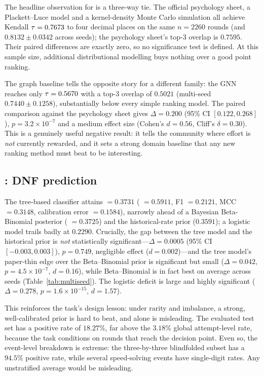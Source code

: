 The headline observation for  is a three-way tie. The official \wca{}
psychology sheet, a Plackett--Luce model and a kernel-density Monte Carlo
simulation all achieve Kendall $\tau=0.7673$ to four decimal places on the
same $n=2260$ rounds (and $0.8132\pm0.0342$ across seeds); the psychology
sheet's top-3 overlap is $0.7595$. Their paired differences are exactly zero,
so no significance test is defined. At this sample size, additional
distributional modelling buys nothing over a good point ranking.

The graph baseline tells the opposite story for a different family: the GNN
reaches only $\tau=0.5670$ with a top-3 overlap of $0.5021$ (multi-seed
$0.7440\pm0.1258$), substantially below every simple ranking model. The paired
comparison against the psychology sheet gives $\Delta=0.200$
(95\% CI $[0.122,0.268]$), $p=3.2\times10^{-7}$ and a medium effect size
(Cohen's $d=0.56$, Cliff's $\delta=0.30$). This is a genuinely useful negative
result: it tells the community where effort is \emph{not} currently rewarded,
and it sets a strong domain baseline that any new ranking method must beat to
be interesting.

\subsection{: DNF prediction}
\label{sec:results-t3}

The tree-based classifier attains \aucpr{} $=0.3731$ (\aucroc{} $=0.5911$,
F1 $=0.2121$, MCC $=0.3148$, calibration error $=0.1584$), narrowly ahead of a
Bayesian Beta-Binomial posterior (\aucpr{} $=0.3725$) and the historical-rate
prior ($0.3591$); a logistic model trails badly at $0.2290$. Crucially, the gap
between the tree model and the historical prior is \emph{not} statistically
significant---$\Delta=0.0005$ (95\% CI $[-0.003,0.003]$), $p=0.749$, negligible
effect ($d=0.002$)---and the tree model's paper-thin edge over the
Beta--Binomial prior is significant but small ($\Delta=0.042$,
$p=4.5\times10^{-7}$, $d=0.16$), while Beta--Binomial is in fact best on
average across seeds (Table~\ref{tab:multiseed}). The logistic deficit is large
and highly significant ($\Delta=0.278$, $p=1.6\times10^{-15}$, $d=1.57$).

This reinforces the task's design lesson: under rarity and imbalance, a strong,
well-calibrated prior is hard to beat, and \aucroc{} alone is misleading. The
evaluated test set has a positive rate of $18.27\%$, far above the $3.18\%$
global attempt-level \DNF{} rate, because the task conditions on rounds that
reach the decision point. Even so, the event-level breakdown is extreme: the
three-by-three blindfolded subset has a $94.5\%$ positive rate, while several
speed-solving events have single-digit rates. Any unstratified average would be
misleading.

